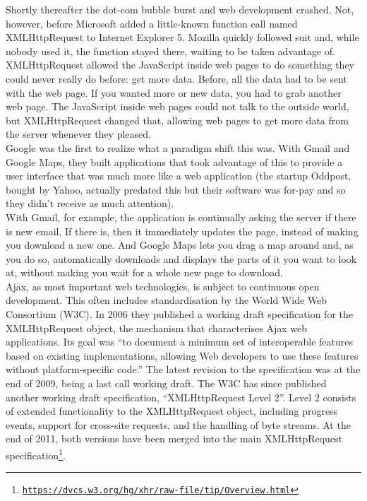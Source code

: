 Shortly thereafter the dot-com bubble burst and web development crashed. Not, however, before Microsoft added a little-known function call named XMLHttpRequest to Internet Explorer 5. Mozilla quickly followed suit and, while nobody used it, the function stayed there, waiting to be taken advantage of.\\

XMLHttpRequest allowed the JavaScript inside web pages to do something they could never really do before: get more data. Before, all the data had to be sent with the web page. If you wanted more or new data, you had to grab another web page. The JavaScript inside web pages could not talk to the outside world, but XMLHttpRequest changed that, allowing web pages to get more data from the server whenever they pleased.\\

Google was the first to realize what a paradigm shift this was. With Gmail and Google Maps, they built applications that took advantage of this to provide a user interface that was much more like a web application (the startup Oddpost, bought by Yahoo, actually predated this but their software was for-pay and so they didn’t receive as much attention).\\

With Gmail, for example, the application is continually asking the server if there is new email. If there is, then it immediately updates the page, instead of making you download a new one. And Google Maps lets you drag a map around and, as you do so, automatically downloads and displays the parts of it you want to look at, without making you wait for a whole new page to download.\\

Ajax, as most important web technologies, is subject to continuous open development. This often includes standardisation by the World Wide Web Consortium (W3C). In 2006 they published a working draft specification for the XMLHttpRequest object, the mechanism that characterises Ajax web applications. Its goal was ``to document a minimum set of interoperable features based on existing implementations, allowing Web developers to use these features without platform-specific code.'' The latest revision to the specification was at the end of 2009, being a last call working draft. The W3C has since published another working draft specification, ``XMLHttpRequest Level 2''. Level 2 consists of extended functionality to the XMLHttpRequest object, including progress events, support for cross-site requests, and the handling of byte streams. At the end of 2011, both versions have been merged into the main XMLHttpRequest specification\footnote{\href{https://dvcs.w3.org/hg/xhr/raw-file/tip/Overview.html}{\nolinkurl{https://dvcs.w3.org/hg/xhr/raw-file/tip/Overview.html}}}.
		
